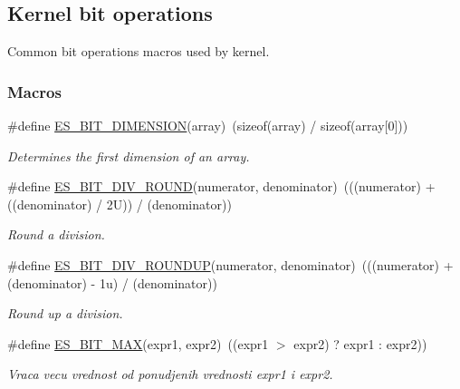 \hypertarget{group__kern__bit__intf}{\subsection{Kernel bit operations}
\label{group__kern__bit__intf}
}


Common bit operations macros used by kernel.  


\subsubsection*{Macros}
\begin{DoxyCompactItemize}
\item 
\#define \hyperlink{group__kern__bit__intf_ga95779da300307c85fa5ad038eb895ec6}{E\-S\-\_\-\-B\-I\-T\-\_\-\-D\-I\-M\-E\-N\-S\-I\-O\-N}(array)~(sizeof(array) / sizeof(array\mbox{[}0\mbox{]}))
\begin{DoxyCompactList}\small\item\em Determines the first dimension of an array. \end{DoxyCompactList}\item 
\#define \hyperlink{group__kern__bit__intf_ga06ba2162e0ba1383ed447236b2a3a090}{E\-S\-\_\-\-B\-I\-T\-\_\-\-D\-I\-V\-\_\-\-R\-O\-U\-N\-D}(numerator, denominator)~(((numerator) + ((denominator) / 2\-U)) / (denominator))
\begin{DoxyCompactList}\small\item\em Round a division. \end{DoxyCompactList}\item 
\#define \hyperlink{group__kern__bit__intf_ga647803e90a134609489c6f3b7aed7821}{E\-S\-\_\-\-B\-I\-T\-\_\-\-D\-I\-V\-\_\-\-R\-O\-U\-N\-D\-U\-P}(numerator, denominator)~(((numerator) + (denominator) -\/ 1u) / (denominator))
\begin{DoxyCompactList}\small\item\em Round up a division. \end{DoxyCompactList}\item 
\#define \hyperlink{group__kern__bit__intf_gaa380d5980cb2ffe4f931019a89426da6}{E\-S\-\_\-\-B\-I\-T\-\_\-\-M\-A\-X}(expr1, expr2)~((expr1 $>$ expr2) ? expr1 \-: expr2))
\begin{DoxyCompactList}\small\item\em Vraca vecu vrednost od ponudjenih vrednosti {\itshape expr1} i {\itshape expr2}. \end{DoxyCompactList}\item 

\end{DoxyCompactItemize}

